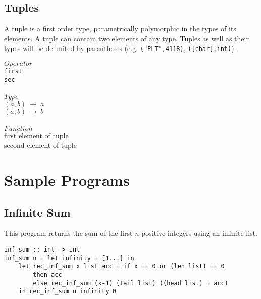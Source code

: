 ﻿\documentclass[5pt]{article}
\begin{document}
\subsection{Tuples}
A tuple is a first order type, parametrically polymorphic in the types of its 
elements. A tuple can contain two elements of any type. Tuples as well as their 
types will be delimited by parentheses (e.g. \texttt{("PLT",4118)}, 
\texttt{([char],int)}).
\begin{multicols}{3}
\noindent $Operator$ \\
\hspace*{5mm} \texttt{first} \\
\hspace*{5mm} \texttt{sec} \\
\columnbreak \\
\noindent $Type$ \\
$(a,b) \ \rightarrow \  a$ \\
$(a,b) \ \rightarrow \  b$ \\
\columnbreak \\
\noindent $Function$ \\
first element of tuple \\
second element of tuple \\
\end{multicols}

\section{Sample Programs}
\subsection{Infinite Sum}
This program returns the sum of the first $n$ positive integers using an 
infinite list.
\begin{lstlisting}[language=rippl]
inf_sum :: int -> int
inf_sum n = let infinity = [1...] in
    let rec_inf_sum x list acc = if x == 0 or (len list) == 0
        then acc
        else rec_inf_sum (x-1) (tail list) ((head list) + acc)
    in rec_inf_sum n infinity 0
\end{lstlisting}
\end{document}
